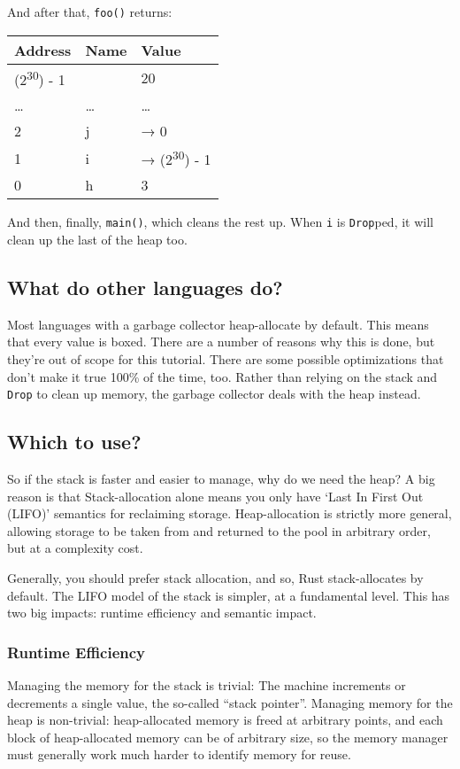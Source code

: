 \documentclass[a4paper,]{book}
\begin{document}
And after that, \texttt{foo()} returns:

\begin{longtable}[]{@{}lll@{}}
\toprule
Address & Name & Value\tabularnewline
\midrule
\endhead
(2\textsuperscript{30}) - 1 & & 20\tabularnewline
\ldots{} & \ldots{} & \ldots{}\tabularnewline
2 & j & → 0\tabularnewline
1 & i & → (2\textsuperscript{30}) - 1\tabularnewline
0 & h & 3\tabularnewline
\bottomrule
\end{longtable}

And then, finally, \texttt{main()}, which cleans the rest up. When
\texttt{i} is \texttt{Drop}ped, it will clean up the last of the heap
too.

\subsection{What do other languages
do?}\label{what-do-other-languages-do}

Most languages with a garbage collector heap-allocate by default. This
means that every value is boxed. There are a number of reasons why this
is done, but they're out of scope for this tutorial. There are some
possible optimizations that don't make it true 100\% of the time, too.
Rather than relying on the stack and \texttt{Drop} to clean up memory,
the garbage collector deals with the heap instead.

\subsection{Which to use?}\label{which-to-use}

So if the stack is faster and easier to manage, why do we need the heap?
A big reason is that Stack-allocation alone means you only have `Last In
First Out (LIFO)' semantics for reclaiming storage. Heap-allocation is
strictly more general, allowing storage to be taken from and returned to
the pool in arbitrary order, but at a complexity cost.

Generally, you should prefer stack allocation, and so, Rust
stack-allocates by default. The LIFO model of the stack is simpler, at a
fundamental level. This has two big impacts: runtime efficiency and
semantic impact.

\subsubsection{Runtime Efficiency}\label{runtime-efficiency}

Managing the memory for the stack is trivial: The machine increments or
decrements a single value, the so-called ``stack pointer''. Managing
memory for the heap is non-trivial: heap-allocated memory is freed at
arbitrary points, and each block of heap-allocated memory can be of
arbitrary size, so the memory manager must generally work much harder to
identify memory for reuse.
\end{document}
